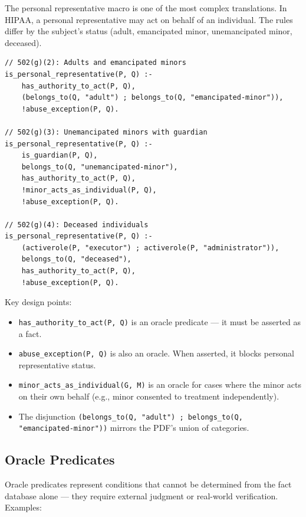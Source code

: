 \documentclass[11pt,letterpaper]{article}
\begin{document}
The personal representative macro is one of the most complex translations. In HIPAA, a personal representative may act on behalf of an individual. The rules differ by the subject's status (adult, emancipated minor, unemancipated minor, deceased).

\begin{lstlisting}[style=soufflestyle,caption={Personal representative rules from hipaa\_macros.dl}]
// 502(g)(2): Adults and emancipated minors
is_personal_representative(P, Q) :-
    has_authority_to_act(P, Q),
    (belongs_to(Q, "adult") ; belongs_to(Q, "emancipated-minor")),
    !abuse_exception(P, Q).

// 502(g)(3): Unemancipated minors with guardian
is_personal_representative(P, Q) :-
    is_guardian(P, Q),
    belongs_to(Q, "unemancipated-minor"),
    has_authority_to_act(P, Q),
    !minor_acts_as_individual(P, Q),
    !abuse_exception(P, Q).

// 502(g)(4): Deceased individuals
is_personal_representative(P, Q) :-
    (activerole(P, "executor") ; activerole(P, "administrator")),
    belongs_to(Q, "deceased"),
    has_authority_to_act(P, Q),
    !abuse_exception(P, Q).
\end{lstlisting}

Key design points:
\begin{itemize}
  \item \texttt{has\_authority\_to\_act(P, Q)} is an oracle predicate --- it must be asserted as a fact.
  \item \texttt{abuse\_exception(P, Q)} is also an oracle. When asserted, it blocks personal representative status.
  \item \texttt{minor\_acts\_as\_individual(G, M)} is an oracle for cases where the minor acts on their own behalf (e.g., minor consented to treatment independently).
  \item The disjunction \texttt{(belongs\_to(Q, "adult") ; belongs\_to(Q, "emancipated-minor"))} mirrors the PDF's union of categories.
\end{itemize}

\subsection{Oracle Predicates}

Oracle predicates represent conditions that cannot be determined from the fact database alone --- they require external judgment or real-world verification. Examples:
\end{document}
